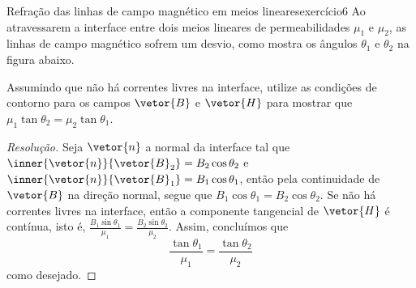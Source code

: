 \begin{exercício}{Refração das linhas de campo magnético em meios lineares}{exercício6}
    Ao atravessarem a interface entre dois meios lineares de permeabilidades \(\mu_1\) e \(\mu_2\), as linhas de campo magnético sofrem um desvio, como mostra os ângulos \(\theta_1\) e \(\theta_2\) na figura abaixo.
    \begin{center}
    \end{center}
    Assumindo que não há correntes livres na interface, utilize as condições de contorno para os campos \(\vetor{B}\) e \(\vetor{H}\) para mostrar que \(\mu_1\tan\theta_2 = \mu_2 \tan\theta_1\).
\end{exercício}
\begin{proof}[Resolução]
    Seja \(\vetor{n}\) a normal da interface tal que \(\inner{\vetor{n}}{\vetor{B}_2} = B_2 \cos\theta_2\) e \(\inner{\vetor{n}}{\vetor{B}_1} = B_1 \cos\theta_1\), então pela continuidade de \(\vetor{B}\) na direção normal, segue que \(B_1 \cos\theta_1 = B_2 \cos\theta_2\). Se não há correntes livres na interface, então a componente tangencial de \(\vetor{H}\) é contínua, isto é, \(\frac{B_1 \sin\theta_1}{\mu_1} = \frac{B_2 \sin\theta_2}{\mu_2}\). Assim, concluímos que
    \begin{equation*}
        \frac{\tan\theta_1}{\mu_1} = \frac{\tan\theta_2}{\mu_2}
    \end{equation*}
    como desejado.
\end{proof}
